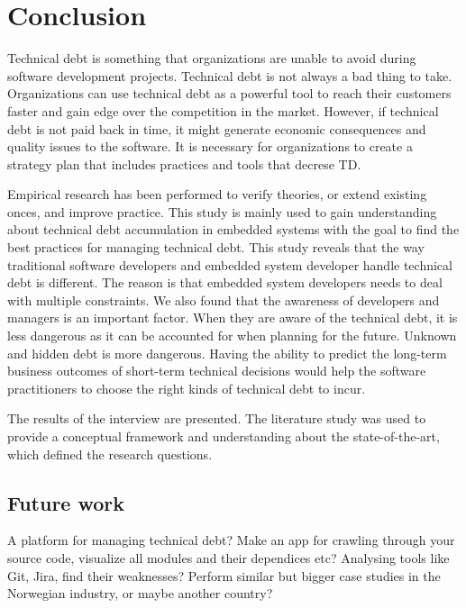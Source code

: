 \chapter{Conclusion}
Technical debt is something that organizations are unable to avoid during software development projects. Technical debt is not always a bad thing to take. Organizations can use technical debt as a powerful tool to reach their customers faster and gain edge over the competition in the market. However, if technical debt is not paid back in time, it might generate economic consequences and quality issues to the software. It is necessary for organizations to create a strategy plan that includes practices and tools that decrese TD.

Empirical research has been performed to verify theories, or extend existing onces, and improve practice. This study is mainly used to gain understanding about technical debt accumulation in embedded systems with the goal to find the best practices for managing technical debt. This study reveals that the way traditional software developers and embedded system developer handle technical debt is different. The reason is that embedded system developers needs to deal with multiple constraints. We also found that the awareness of developers and managers is an important factor. When they are aware of the technical debt, it is less dangerous as it can be accounted for when planning for the future. Unknown and hidden debt is more dangerous. Having the ability to predict the long-term business outcomes of short-term technical decisions would help the software practitioners to choose the right kinds of technical debt to incur.

The results of the interview are presented. The literature study was used to provide a conceptual framework and understanding about the state-of-the-art, which defined the research questions.

\section{Future work}
A platform for managing technical debt? Make an app for crawling through your source code, visualize all modules and their dependices etc? Analysing tools like Git, Jira, find their weaknesses? Perform similar but bigger case studies in the Norwegian industry, or maybe another country?